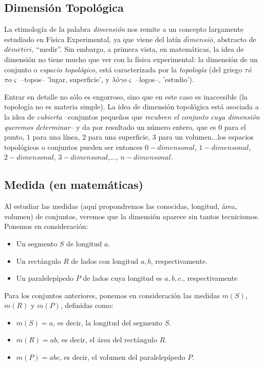 \documentclass[10pt,a4paper]{article}
\numberwithin{equation}{section}
\begin{document}
\subsection{Dimensión Topológica}
La etimología de la palabra \textit{dimensión} nos remite a un concepto largamente estudiado en Física Experimental, ya que viene del latín $d\bar{i}mensi\bar{o}$, abstracto de $d\bar{e}m\bar{e}tiri$, ``medir''. Sin embargo, a primera vista, en matemáticas, la idea de dimensión no tiene mucho que ver con la física experimental: la dimensión de un conjunto o \textit{espacio topológico}, está caracterizada por la \textit{topología} (del griego \textit{$\tau$\hspace*{-0.5mm}ó$\pi o \varsigma$} --topos--  'lugar, superficie', y $\lambda$ó$\gamma o \varsigma$ --logos--, 'estudio').

Entrar en detalle no sólo es engorroso, sino que en este caso es inaccesible (la topología no es materia simple). La idea de dimensión topológica está asociada a la idea de \textit{cubierta} --conjuntos pequeños que \textit{recubren  el conjunto cuya dimensión queremos determinar}-- y da por resultado un número entero, que es $0$ para el punto, $1$ para una línea, $2$ para una superficie, $3$ para un volumen...los espacios topológicos o conjuntos pueden ser entonces $0-dimensonal$, $1-dimensonal$, $2-dimensonal$, $3-dimensonal$,..., $n-dimensonal$.

\subsection{Medida (en matemáticas)}
Al estudiar las medidas (aquí propondremos las conocidas, longitud, área, volumen) de conjuntos, veremos que la dimensión aparece sin tantos tecnicismos. Ponemos en consideración:

\begin{itemize}
\item[\textbf{i)}] Un segmento $S$ de longitud $a$.
\item[\textbf{ii)}] Un rectángulo $R$ de lados con longitud $a,b$, respectivamente.
\item[\textbf{iii)}] Un paralelepípedo $P$ de lados cuya longitud es $a,b,c$., respectivamente 
\end{itemize}

Para los conjuntos anteriores, ponemos en consideración las medidas $m(S)$, $m(R)$ y $m(P)$, definidas como:
\begin{itemize}
\item[\textbf{i)}] $m(S) = a$, es decir, la longitud del segmento $S$.
\item[\textbf{ii)}] $m(R) = ab$, es decir, el área del rectángulo $R$.
\item[\textbf{iii)}] $m(P) = abc$, es decir, el volumen del paralelepípedo $P$.
\end{itemize}
\end{document}
